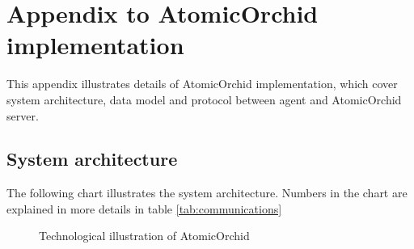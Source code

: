 \chapter{Appendix to AtomicOrchid implementation}
This appendix illustrates details of AtomicOrchid implementation, which cover system architecture, data model and protocol between agent and AtomicOrchid server.

\section{System architecture}
The following chart illustrates the system architecture. Numbers in the chart are explained in more details in table \ref{tab:communications}
\begin{figure}[H]
  \centering
  \caption{Technological illustration of AtomicOrchid}
  \label{fig:systemDescription}
\end{figure}

